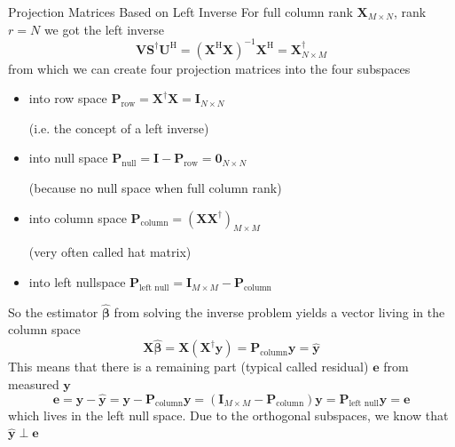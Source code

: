 \documentclass[mathserif, aspectratio=1610]{intbeamer}
\begin{document}
\begin{frame}{Projection Matrices Based on Left Inverse}
For full column rank $\bm{X}_{M \times N}$, rank $r=N$ we got the left inverse
$$\bm{V} \bm{S}^\dagger\bm{U}^\mathrm{H} = (\bm{X}^\mathrm{H}\bm{X})^{-1} \bm{X}^\mathrm{H} = \bm{X}^\dagger_{N \times M}$$
from which we can create four projection matrices into the four subspaces
\begin{itemize}
\item into row space $\bm{P}_\text{row} = \bm{X}^\dagger \bm{X} = \bm{I}_{N \times N}$ \begin{footnotesize}(i.e. the concept of a left inverse)\end{footnotesize}
\item into null space $\bm{P}_\text{null} = \bm{I} - \bm{P}_\text{row} = \bm{0}_{N \times N}$ \begin{footnotesize}(because no null space when full column rank)\end{footnotesize}
\item into column space $\bm{P}_\text{column} = (\bm{X} \bm{X}^\dagger)_{M \times M}$ \begin{footnotesize}(very often called hat matrix)\end{footnotesize}
\item into left nullspace $\bm{P}_\text{left null} = \bm{I}_{M \times M} - \bm{P}_\text{column}$
\end{itemize}

So the estimator $\hat{\bm{\beta}}$ from solving the inverse problem yields a vector living in the column space
$$\bm{X} \hat{\bm{\beta}} = \bm{X} (\bm{X}^\dagger \bm{y}) = \bm{P}_\text{column} \bm{y} = \hat{\bm{y}}$$
This means that there is a remaining part (typical called residual) $\bm{e}$ from measured $\bm{y}$
$$\bm{e} = \bm{y} - \hat{\bm{y}} = \bm{y} - \bm{P}_\text{column} \bm{y} = (\bm{I}_{M \times M} - \bm{P}_\text{column}) \bm{y}=
\bm{P}_\text{left null} \bm{y} = \bm{e}$$
which lives in the left null space. Due to the orthogonal subspaces, we know that $\hat{\bm{y}} \perp \bm{e}$

\end{frame}
\end{document}
